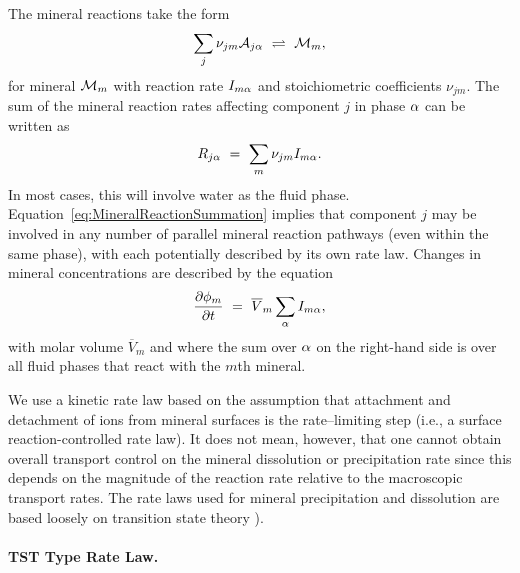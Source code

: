 The mineral reactions take the form
%
\begin{equation} 
 \sum_j\nu_{jm} {\mathcal A}_{j{\alpha}} ~\rightleftharpoons~ {\mathcal M}_m,
 \label{heterogeneous-restated}
\end{equation}
%
for mineral ${\mathcal M}_m$ with reaction rate $I_{m{\alpha}}$ and stoichiometric
coefficients $\nu_{jm}$.  The sum of the mineral reaction rates
affecting component $j$ in phase ${\alpha}$ can be written as
%
\begin{equation} 
 R_{j{\alpha}} \ =\  \sum_m\nu_{jm} I_{m{{\alpha}}}.
 \label{eq:MineralReactionSummation}
\end{equation} 
In most cases, this will involve water as the fluid phase.
Equation~\eqref{eq:MineralReactionSummation} implies that component $j$
may be involved in any number of parallel mineral reaction pathways
(even within the same phase), with each potentially described by its
own rate law.  Changes in mineral concentrations are described by the
equation
%
\begin{equation}
  \frac{\partial \phi_m}{\partial t} \ =\  \overline V_m \sum_{\alpha} I_{m{\alpha}},
\end{equation} 
%
with molar volume $\overline V_m$ and where the sum over ${\alpha}$ on the
right-hand side is over all fluid phases that react with the $m$th
mineral.

We use a kinetic rate law based on the assumption that attachment and detachment of ions from mineral surfaces is the rate--limiting step (i.e., a surface reaction-controlled rate law). It does not mean, however, that one cannot obtain overall transport control on the mineral dissolution or precipitation rate since this depends on the magnitude of the reaction rate relative to the macroscopic transport rates. The rate laws used for mineral precipitation and dissolution are based loosely on transition state theory \citep{lasaga_1981,aagaard_1982,lasaga_1984}). 

\paragraph{TST Type Rate Law.}


